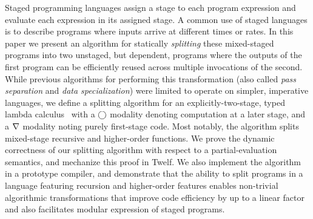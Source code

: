 
Staged programming languages assign a stage to each program expression
and evaluate each expression in its assigned stage. A common use of
staged languages is to describe programs where inputs arrive at
different times or rates. In this paper we present an algorithm for
statically {\em splitting} these mixed-staged programs into two
unstaged, but dependent, programs where the outputs of the first
program can be efficiently reused across multiple invocations of the
second. While previous algorithms for performing this transformation
(also called \emph{pass separation} and \emph{data specialization})
were limited to operate on simpler, imperative languages, we define a
splitting algorithm for an explicitly-two-stage, typed lambda
calculus \lang\ with a $\bigcirc$ modality denoting computation at a later
stage, and a $\nabla$ modality noting purely first-stage code.  Most
notably, the algorithm splits mixed-stage recursive and higher-order
functions.  We prove the dynamic correctness of our splitting
algorithm with respect to a partial-evaluation semantics, and
mechanize this proof in Twelf. We also implement the algorithm
in a prototype compiler, and demonstrate that the ability to split
programs in a language featuring recursion and higher-order features
enables non-trivial algorithmic transformations that
improve code efficiency by up to a linear factor and also
facilitates modular expression of staged programs.

